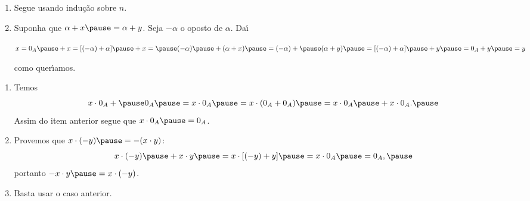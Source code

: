 \documentclass{beamer}
\begin{document}
    \begin{frame}
            \begin{enumerate}[label={\roman*})]
                \conti

                \item Segue usando indu\c{c}\~ao sobre $n$.\pause

                \vspace{.5cm}

                \item Suponha que $\alpha + x \pause = \alpha + y$. \pause Seja $-\alpha$ \pause o oposto de $\alpha$. \pause Da{\'\i}\pause
                \begin{center}
                    $x = 0_A \pause + x = [(-\alpha) + \alpha] \pause + x = \pause (-\alpha) \pause + (\alpha + x) \pause = (-\alpha) + \pause (\alpha + y) \pause = [(-\alpha) + \alpha] \pause + y \pause = 0_A + y \pause = y$\pause
                \end{center}
                como quer{\'\i}amos.\pause
            \end{enumerate}
    \end{frame}

    \begin{frame}
            \begin{enumerate}[label={\roman*})]
                \conti
                \item Temos \pause
                \[
                    x\cdot 0_A + \pause 0_A \pause = x\cdot 0_A \pause = x\cdot(0_A + 0_A) \pause = x\cdot 0_A \pause + x\cdot 0_A.\pause
                \]
                Assim do item anterior \pause segue que $x\cdot 0_A \pause = 0_A$.\pause

                \vspace{.5cm}

                \item Provemos que \pause $x \cdot (-y) \pause = -(x \cdot y)$\pause :
                \[
                    x \cdot (-y) \pause + x \cdot y \pause = x \cdot [(-y) + y] \pause = x\cdot 0_A \pause = 0_A,\pause
                \]
                portanto $-x \cdot y \pause = x \cdot (-y)$.\pause

                \vspace{.5cm}
                
                \item Basta usar o caso anterior.\pause
            \end{enumerate}
    \end{frame}
\end{document}
